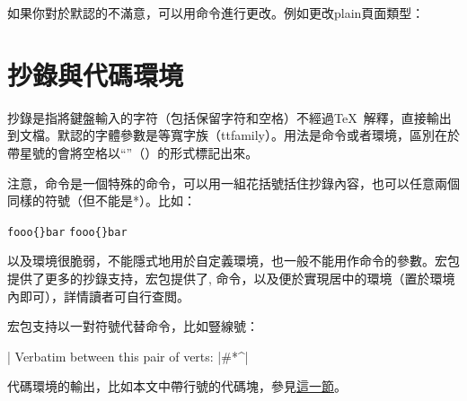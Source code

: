 如果你對於默認的不滿意，可以用命令進行更改。例如更改plain頁面類型：
\begin{latex}
\end{latex}

\section{抄錄與代碼環境}
抄錄是指將鍵盤輸入的字符（包括保留字符和空格）不經過\TeX\ 解釋，直接輸出到文檔。默認的字體參數是等寬字族（ttfamily）。用法是命令或者環境，區別在於帶星號的會將空格以“\textvisiblespace”（）的形式標記出來。

注意，命令是一個特殊的命令，可以用一組花括號括住抄錄內容，也可以任意兩個同樣的符號（但不能是*）。比如：
\begin{latex}
\verb|fooo{}bar|
\verb+fooo{}bar+
\end{latex}

以及環境很脆弱，不能隱式地用於自定義環境，也一般不能用作命令的參數。宏包提供了更多的抄錄支持，宏包提供了, 命令，以及便於實現居中的環境（置於環境內即可），詳情讀者可自行查閲。

宏包支持以一對符號代替命令，比如豎線號：
\begin{latex}
\MakeShortVerb|
Verbatim between this pair of verts: |#\?*^|
\end{latex}

代碼環境的輸出，比如本文中帶行號的代碼塊，參見\hyperref[sec:coding]{這一節}。

